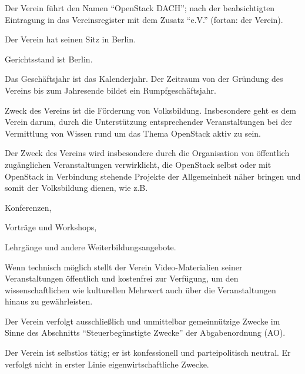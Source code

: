 \documentclass[draft]{scrartcl}
\newcommand{\VereinsName}{OpenStack DACH}
\begin{document}
\pagebreak
\ihead{\footnotesize \thetitle}
\begin{contract}


Der Verein führt den Namen "`\VereinsName"'; nach der beabsichtigten
Eintragung in das Vereinsregister mit dem Zusatz "`e.V."' (fortan: der
Verein).

Der Verein hat seinen Sitz in Berlin.

Gerichtsstand ist Berlin.

Das Geschäftsjahr ist das Kalenderjahr. Der Zeitraum von der Gründung des
Vereins bis zum Jahresende bildet ein Rumpfgeschäftsjahr.


\parnumberfalse

\label{Zweck}
Zweck des Vereins ist die Förderung von Volksbildung. Insbesondere geht es
dem Verein darum, durch die Unterstützung entsprechender Veranstaltungen
bei der Vermittlung von Wissen rund um das Thema OpenStack aktiv zu sein.

Der Zweck des Vereins wird insbesondere durch die Organisation von öffentlich
zu\-gäng\-li\-chen Veranstaltungen verwirklicht, die OpenStack selbst oder
mit OpenStack in Verbindung stehende Projekte der Allgemeinheit näher
bringen und somit der Volksbildung dienen, wie z.B.

\begin{compactitem}
  \item Konferenzen,
  \item Vorträge und Workshops,
  \item Lehrgänge und andere Weiterbildungsangebote.
\end{compactitem}

Wenn technisch möglich stellt der Verein Video-Materialien seiner Veranstaltungen
öf\-fent\-lich und kostenfrei zur Verfügung, um den wissenschaftlichen wie kulturellen
Mehrwert auch über die Veranstaltungen hinaus zu gewährleisten.

\label{Gemeinnuetzigkeit}

Der Verein verfolgt ausschließlich und unmittelbar gemeinnützige Zwecke im
Sinne des Abschnitts "`Steuerbegünstigte Zwecke"' der Abgabenordnung (AO).

Der Verein ist selbstlos tätig; er ist konfessionell und parteipolitisch
neutral. Er verfolgt nicht in erster Linie eigenwirtschaftliche Zwecke.


\end{contract}
\end{document}
